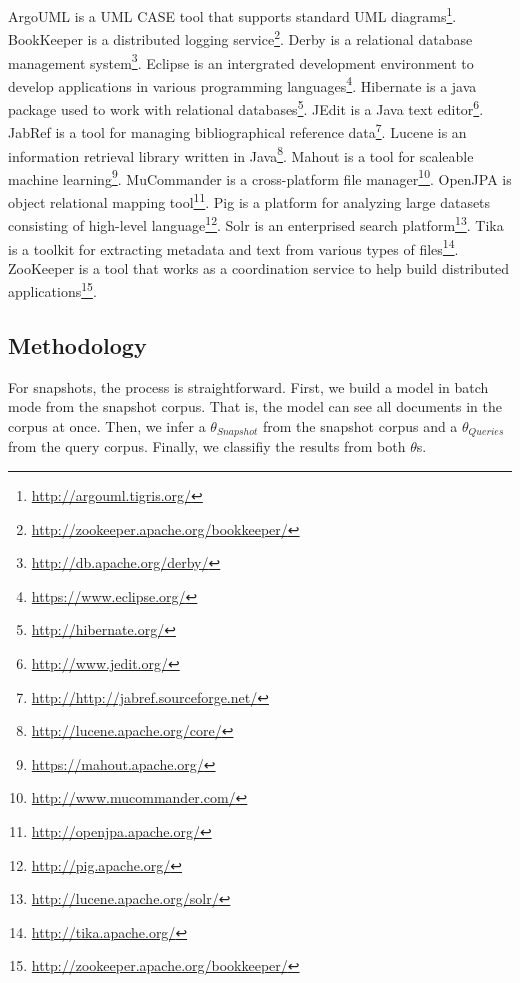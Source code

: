 ArgoUML is a UML CASE tool that supports standard UML
diagrams\footnote{\url{http://argouml.tigris.org/}}.  BookKeeper is a
distributed logging
service\footnote{\url{http://zookeeper.apache.org/bookkeeper/}}.  Derby is a
relational database management
system\footnote{\url{http://db.apache.org/derby/}}.  Eclipse is an intergrated
development environment to develop applications in various programming
languages\footnote{\url{https://www.eclipse.org/}}.  Hibernate is a java
package used to work with relational
databases\footnote{\url{http://hibernate.org/}}.  JEdit is a Java text
editor\footnote{\url{http://www.jedit.org/}}.  JabRef is a tool for managing
bibliographical reference
data\footnote{\url{http://http://jabref.sourceforge.net/}}.  Lucene is an
information retrieval library written in
Java\footnote{\url{http://lucene.apache.org/core/}}.  Mahout is a tool for
scaleable machine learning\footnote{\url{https://mahout.apache.org/}}.
MuCommander is a cross-platform file
manager\footnote{\url{http://www.mucommander.com/}}.  OpenJPA is object
relational mapping tool\footnote{\url{http://openjpa.apache.org/}}.  Pig is a
platform for analyzing large datasets consisting of high-level
language\footnote{\url{http://pig.apache.org/}}.  Solr is an enterprised search
platform\footnote{\url{http://lucene.apache.org/solr/}}.  Tika is a toolkit for
extracting metadata and text from various types of
files\footnote{\url{http://tika.apache.org/}}.  ZooKeeper is a tool that works
as a coordination service to help build distributed
applications\footnote{\url{http://zookeeper.apache.org/bookkeeper/}}.



\subsection{Methodology}
\label{sec:methodology}

For snapshots, the process is straightforward.
First, we build a model in batch mode from the snapshot corpus.
That is, the model can see all documents in the corpus at once.
Then, we infer a $\theta_{Snapshot}$ from the snapshot corpus
and a $\theta_{Queries}$ from the query corpus.
Finally, we classifiy the results from both $\theta$s.

\begin{comment}
\begin{enumerate}
    \item Build model from the snapshot corpus in batch mode
    \item Infer a $\theta_{Snapshot}$ from the snapshot corpus
    \item Infer a $\theta_{Queries}$ from the query corpus
    \item Classifiy, or rank, the results from both $\theta$s
\end{enumerate}
\end{comment}



